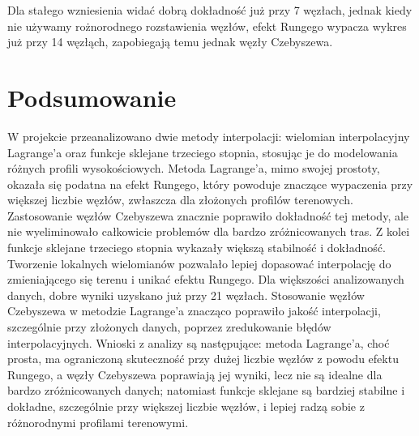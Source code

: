 \documentclass{article}
\begin{document}
Dla stałego wzniesienia widać dobrą dokładność już przy 7 węzłach, jednak kiedy nie używamy rożnorodnego rozstawienia węzłów, efekt Rungego wypacza wykres już przy 14 węzłąch, zapobiegają temu jednak węzły Czebyszewa.

\clearpage
\section{Podsumowanie}

W projekcie przeanalizowano dwie metody interpolacji: wielomian interpolacyjny Lagrange'a oraz funkcje sklejane trzeciego stopnia, stosując je do modelowania różnych profili wysokościowych. Metoda Lagrange'a, mimo swojej prostoty, okazała się podatna na efekt Rungego, który powoduje znaczące wypaczenia przy większej liczbie węzłów, zwłaszcza dla złożonych profilów terenowych. Zastosowanie węzłów Czebyszewa znacznie poprawiło dokładność tej metody, ale nie wyeliminowało całkowicie problemów dla bardzo zróżnicowanych tras. Z kolei funkcje sklejane trzeciego stopnia wykazały większą stabilność i dokładność. Tworzenie lokalnych wielomianów pozwalało lepiej dopasować interpolację do zmieniającego się terenu i unikać efektu Rungego. Dla większości analizowanych danych, dobre wyniki uzyskano już przy 21 węzłach. Stosowanie węzłów Czebyszewa w metodzie Lagrange'a znacząco poprawiło jakość interpolacji, szczególnie przy złożonych danych, poprzez zredukowanie błędów interpolacyjnych. Wnioski z analizy są następujące: metoda Lagrange'a, choć prosta, ma ograniczoną skuteczność przy dużej liczbie węzłów z powodu efektu Rungego, a węzły Czebyszewa poprawiają jej wyniki, lecz nie są idealne dla bardzo zróżnicowanych danych; natomiast funkcje sklejane są bardziej stabilne i dokładne, szczególnie przy większej liczbie węzłów, i lepiej radzą sobie z różnorodnymi profilami terenowymi.
\end{document}
